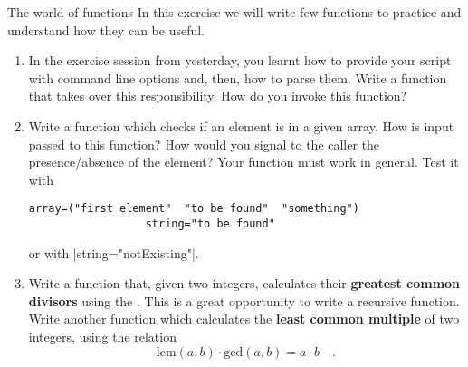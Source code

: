 
\begin{exercise}[Instructive]{The world of functions}
    In this exercise we will write few functions to practice and understand how they can be useful.
    \begin{enumerate}
        \item In the exercise session from yesterday, you learnt how to provide your script with command line options and, then, how to parse them.
              Write a function that takes over this responsibility.
              How do you invoke this function?
        \item Write a function which checks if an element is in a given array.
              How is input passed to this function?
              How would you signal to the caller the presence/absence of the element?
              Your function must work in general.
              Test it with
              \begin{lstlisting}[style=MyBash]
                  array=("first element"  "to be found"  "something")
                  string="to be found"
              \end{lstlisting}
              or with \bash|string="notExisting"|.
        \item Write a function that, given two integers, calculates their \textbf{greatest common divisors} using the .
              This is a great opportunity to write a recursive function.
              Write another function which calculates the \textbf{least common multiple} of two integers, using the relation
              \[
                \mbox{lcm}(a,b)\cdot\mbox{gcd}(a,b)=a\cdot b \quad.
              \]
    \end{enumerate}
\end{exercise}



